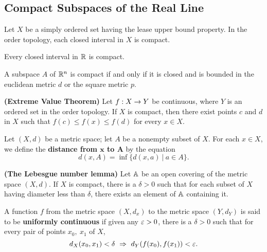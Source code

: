 \subsection{Compact Subspaces of the Real Line}\nl
\setcounter{section}{27}
\setcounter{thm}{0}

\vs

\begin{thm}
Let $X$ be a simply ordered set having the lease upper bound property. In the order topology, each closed interval in $X$ is compact.
\end{thm}

\vs

\begin{cor}
Every closed interval in $\mathbb{R}$ is compact.
\end{cor}

\vs

\begin{thm}
A subspace $A$ of $\mathbb{R}^n$ is compact if and only if it is closed and is bounded in the euclidean metric $d$ or the square metric $p$.
\end{thm}

\vs

\begin{thm}\textbf{(Extreme Value Theorem)}
Let $f:X\rightarrow Y$ be continuous, where $Y$ is an ordered set in the order topology. If $X$ is compact, then there exist points $c$ and $d$ in $X$ such that $f(c) \leq f(x) \leq f(d)$ for every $x\in X$.
\end{thm}

\vs

\dfn Let $(X,d)$ be a metric space; let $A$ be a nonempty subset of $X$. For each $x\in X$, we define the \textbf{distance from $\boldsymbol{x}$ to $\boldsymbol{A}$} by the equation
\[d(x, A) = \inf\{d(x,a)\ |\ a\in A\}.\]

\vs

\begin{lem}\textbf{(The Lebesgue number lemma)}
Let $\mathbb{A}$ be an open covering of the metric space $(X, d)$. If $X$ is compact, there is a $\delta > 0$ such that for each subset of $X$ having diameter less than $\delta$, there exists an element of $\mathbb{A}$ containing it.
\end{lem}

\vs

\dfn A function $f$ from the metric space $(X, d_x)$ to the metric space $(Y, d_Y)$ is said to be \textbf{uniformly continuous} if given any $\varepsilon > 0$, there is a $\delta > 0$ such that for every pair of points $x_0,\ x_1$ of $X$,
\[d_X(x_0,x_1) < \delta\ \Ra\ d_Y(f(x_0),f(x_1)) < \vep.\]

